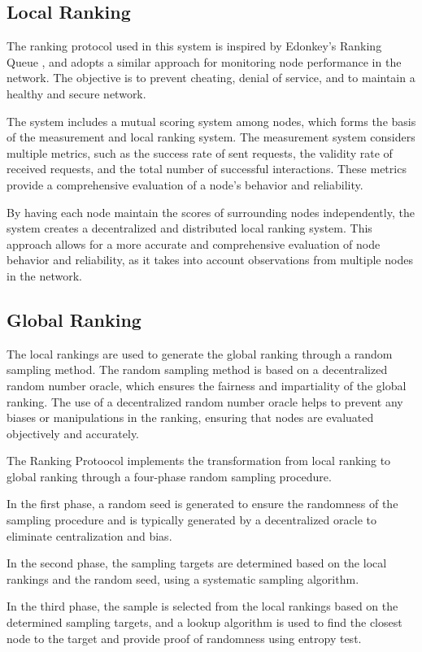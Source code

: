 \documentclass[twocolumn]{article}
\begin{document}
\subsection{Local Ranking}
The ranking protocol used in this system is inspired by Edonkey's Ranking Queue \cite{Edonkey}, and adopts a similar approach for monitoring node performance in the network. The objective is to prevent cheating, denial of service, and to maintain a healthy and secure network.

The system includes a mutual scoring system among nodes, which forms the basis of the measurement and local ranking system. The measurement system considers multiple metrics, such as the success rate of sent requests, the validity rate of received requests, and the total number of successful interactions. These metrics provide a comprehensive evaluation of a node's behavior and reliability.

By having each node maintain the scores of surrounding nodes independently, the system creates a decentralized and distributed local ranking system. This approach allows for a more accurate and comprehensive evaluation of node behavior and reliability, as it takes into account observations from multiple nodes in the network.

\subsection{Global Ranking}
The local rankings are used to generate the global ranking through a random sampling method. The random sampling method is based on a decentralized random number oracle, which ensures the fairness and impartiality of the global ranking. The use of a decentralized random number oracle helps to prevent any biases or manipulations in the ranking, ensuring that nodes are evaluated objectively and accurately.

The Ranking Protoocol implements the transformation from local ranking to global ranking through a four-phase random sampling procedure.

In the first phase, a random seed is generated to ensure the randomness of the sampling procedure and is typically generated by a decentralized oracle to eliminate centralization and bias.

In the second phase, the sampling targets are determined based on the local rankings and the random seed, using a systematic sampling algorithm.

In the third phase, the sample is selected from the local rankings based on the determined sampling targets, and a lookup algorithm is used to find the closest node to the target and provide proof of randomness using entropy test\cite{entropy}.
\end{document}
